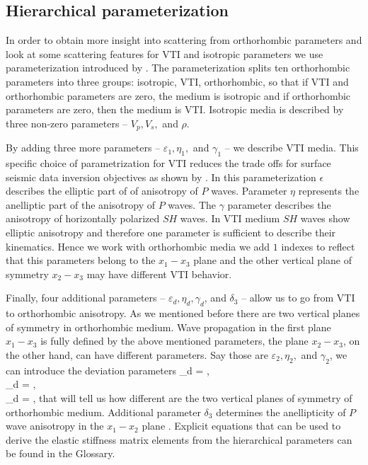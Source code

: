 \subsection{Hierarchical parameterization}

In order to obtain more insight into scattering from orthorhombic parameters and look at some scattering features for VTI and isotropic parameters we use parameterization introduced by \cite{juwon2016}. The parameterization splits ten orthorhombic parameters into three groups: isotropic, VTI, orthorhombic, so that if VTI and orthorhombic parameters are zero, the medium is isotropic and if orthorhombic parameters are zero, then the medium is VTI.  
Isotropic media is described by three non-zero parameters -- $V_p,V_s,$ and $\rho$. %

By adding three more parameters -- $\varepsilon_1, \eta_1,$ and $\gamma_1$ -- we describe VTI media. This specific choice of parametrization for VTI reduces the trade offs for surface seismic data inversion objectives as shown by \cite{alkhalifah2014}. In this parameterization $\epsilon$ describes the elliptic part of of anisotropy of $P$ waves. Parameter $\eta$ represents the anelliptic part of the anisotropy of $P$ waves. The $\gamma$ parameter describes the anisotropy of horizontally polarized $SH$ waves. In VTI medium $SH$ waves show elliptic anisotropy and therefore one parameter is sufficient to describe their kinematics. Hence we work with orthorhombic media we add $1$ indexes to reflect that this parameters belong to the $x_1-x_3$ plane and the other vertical plane of symmetry $x_2-x_3$ may have different VTI behavior. 


Finally, four additional parameters -- $\varepsilon_d, \eta_d, \gamma_d$, and $\delta_3$ -- allow us to go from VTI to orthorhombic anisotropy. As we mentioned before there are two vertical planes of symmetry in orthorhombic medium. Wave propagation in the first plane $x_1-x_3$ is fully defined by the above mentioned parameters, the plane $x_2-x_3$, on the other hand, can have different parameters. Say those are $\varepsilon_2, \eta_2,$ and $\gamma_2$, we can introduce the deviation parameters 
\beq
\varepsilon_d = ,
\\
\eta_d = ,
\\ 
\gamma_d = ,
\eeq
that will tell us how different are the two vertical planes of symmetry of orthorhombic medium. Additional parameter $\delta_3$ determines the anellipticity of $P$ wave anisotropy in the $x_1-x_2$ plane \citep{juwon2016}. Explicit equations that can be used to derive the elastic stiffness matrix elements from the hierarchical parameters can be found in the Glossary. 

